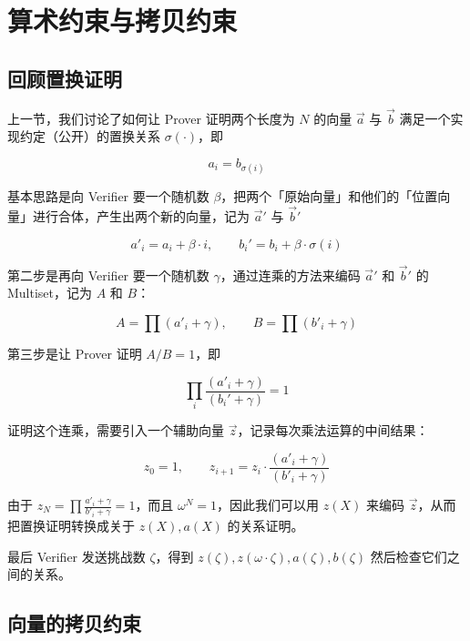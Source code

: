 \hypertarget{ux7406ux89e3-plonkux56dbux7b97ux672fux7ea6ux675fux4e0eux62f7ux8d1dux7ea6ux675f}{%
\chapter{算术约束与拷贝约束}\label{ux7406ux89e3-plonkux56dbux7b97ux672fux7ea6ux675fux4e0eux62f7ux8d1dux7ea6ux675f}}

\hypertarget{ux56deux987eux7f6eux6362ux8bc1ux660e}{%
\section{回顾置换证明}\label{ux56deux987eux7f6eux6362ux8bc1ux660e}}

上一节，我们讨论了如何让 Prover 证明两个长度为 \(N\) 的向量 \(\vec{a}\)
与 \(\vec{b}\) 满足一个实现约定（公开）的置换关系 \(\sigma(\cdot)\)，即

\[
a_i = b_{\sigma(i)}
\]

基本思路是向 Verifier 要一个随机数
\(\beta\)，把两个「原始向量」和他们的「位置向量」进行合体，产生出两个新的向量，记为
\(\vec{a}'\) 与 \(\vec{b}'\)

\[
a'_i = a_i + \beta \cdot i, \qquad b_i'=b_i+\beta\cdot \sigma(i)
\]

第二步是再向 Verifier 要一个随机数 \(\gamma\)，通过连乘的方法来编码
\(\vec{a}'\) 和 \(\vec{b}'\) 的 Multiset，记为 \(A\) 和 \(B\)：

\[
A = \prod(a'_i + \gamma),\qquad B = \prod(b'_i + \gamma)
\]

第三步是让 Prover 证明 \(A/B=1\)，即

\[
\prod_i\frac{(a'_i + \gamma)}{(b_i'+\gamma)} = 1
\]

证明这个连乘，需要引入一个辅助向量
\(\vec{z}\)，记录每次乘法运算的中间结果：

\[
z_0=1, \qquad z_{i+1}=z_i\cdot \frac{(a'_i+\gamma)}{(b'_i+\gamma)}
\]

由于 \(z_N=\prod\frac{a'_i+\gamma}{b'_i+\gamma}=1\)，而且
\(\omega^N=1\)，因此我们可以用 \(z(X)\) 来编码
\(\vec{z}\)，从而把置换证明转换成关于 \(z(X), a(X)\) 的关系证明。

最后 Verifier 发送挑战数 \(\zeta\)，得到
\(z(\zeta), z(\omega\cdot\zeta), a(\zeta), b(\zeta)\)
然后检查它们之间的关系。

\hypertarget{ux5411ux91cfux7684ux62f7ux8d1dux7ea6ux675f}{%
\section{向量的拷贝约束}\label{ux5411ux91cfux7684ux62f7ux8d1dux7ea6ux675f}}

